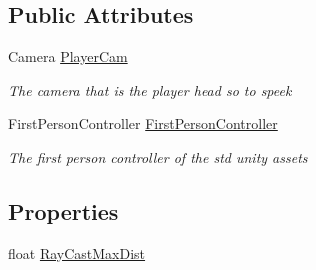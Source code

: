 \subsection*{Public Attributes}
\begin{DoxyCompactItemize}
\item 
Camera \mbox{\hyperlink{class_player_af09423c3841ebcb3c1e77cf3fa1b0084}{Player\+Cam}}
\begin{DoxyCompactList}\small\item\em The camera that is the player head so to speek \end{DoxyCompactList}\item 
First\+Person\+Controller \mbox{\hyperlink{class_player_a2b1dcb2e1f53c780a7501dbc6f89a174}{First\+Person\+Controller}}
\begin{DoxyCompactList}\small\item\em The first person controller of the std unity assets \end{DoxyCompactList}\end{DoxyCompactItemize}
\subsection*{Properties}
\begin{DoxyCompactItemize}
\item 
float \mbox{\hyperlink{class_player_adafd180f492907d445a3ace023f63040}{Ray\+Cast\+Max\+Dist}}
\end{DoxyCompactItemize}
